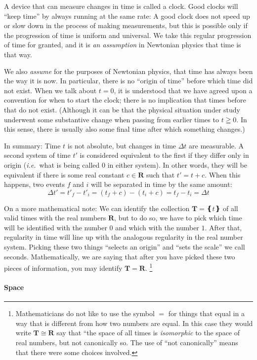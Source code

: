 A device that can measure changes in time is called a clock. Good clocks will “keep time” by always running at the same rate: A good clock does not speed up or slow down in the process of making measurements, but this is possible only if the progression of time is uniform and universal. 
We take this regular progression of time for granted, and it is {\em an assumption} in Newtonian physics that time is that way. 

We also {\em assume} for the purposes of Newtonian physics, that time has always been the way it is now. In particular, there is no “origin of time” before which time did not exist. When we talk about $t=0$, it is understood that we have agreed upon a convention for when to start the clock; there is no implication that times before that do not exist. (Although it can be that the physical situation under study underwent some substantive change when passing from earlier times to $t ≧ 0$. In this sense, there is usually also some final time after which something changes.)

In summary: Time $t$ is not absolute, but changes in time $Δt$ are measurable. A second system of time $t'$ is considered equivalent to the first if they differ only in origin ({\it i.e.}\ what is being called $0$ in either system). In other words, they will be equivalent if there is some real constant $c∈ 𝐑$ such that $t'  = t+ c$. When this happens, two events $f$ and $i$ will be separated in time by the same amount:
$$
Δt' = t'_f - t'_i = (t_f +c) - (t_i +c) = t_f-t_i =Δt 
$$

On a more mathematical note: We can identify the collection $𝐓 = ❴t❵$ of all valid times with the real numbers $𝐑$, but to do so, we have to pick which time will be identified with the number $0$ and which with the number $1$. After that, regularity in time will line up with the analogous regularity in the real number system. Picking these two things “selects an origin” and “sets the scale” we call seconds. Mathematically, we are saying that after you have picked these two pieces of information, you may identify $𝐓 = 𝐑$. \footnote{Mathematicians do not like to use the symbol $=$ for things that equal in a way that is different from how two numbers are equal. In this case they would write $𝐓 ≅ 𝐑$ say that “the space of all times is {\em isomorphic} to the space of real numbers, but not canonically so. The use of “not canonically” means that there were some choices involved.}



\paragraph{Space}

